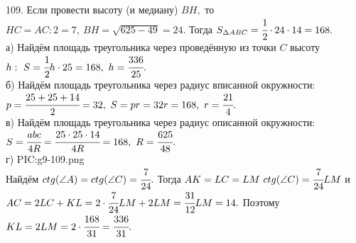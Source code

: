 109. Если провести высоту (и медиану) $BH,$ то $HC=AC:2=7,\ BH=\sqrt{625-49}=24.$ Тогда $S_{\Delta ABC}=\cfrac{1}{2}\cdot24\cdot14=168.$\\
а) Найдём площадь треугольника через проведённую из точки $C$ высоту $h:\ S=\cfrac{1}{2}h\cdot25=168,\ h=\cfrac{336}{25}.$\\
б) Найдём площадь треугольника через радиус вписанной окружности: $p=\cfrac{25+25+14}{2}=32,\ S=pr=32r=168,\ r=\cfrac{21}{4}.$\\
в) Найдём площадь треугольника через радиус описанной окружности: $S=\cfrac{abc}{4R}=\cfrac{25\cdot25\cdot14}{4R}=168,\ R=\cfrac{625}{48}.$\\
г) {{PIC:g9-109.png}}\\
Найдём $ctg(\angle A)=ctg(\angle C)=\cfrac{7}{24}.$ Тогда $AK=LC=LM\ ctg(\angle C)=\cfrac{7}{24}LM$ и $AC=2LC+KL=2\cdot\cfrac{7}{24}LM+2LM=\cfrac{31}{12}LM=14.$ Поэтому $KL=2LM=2\cdot\cfrac{168}{31}=\cfrac{336}{31}.$\\
